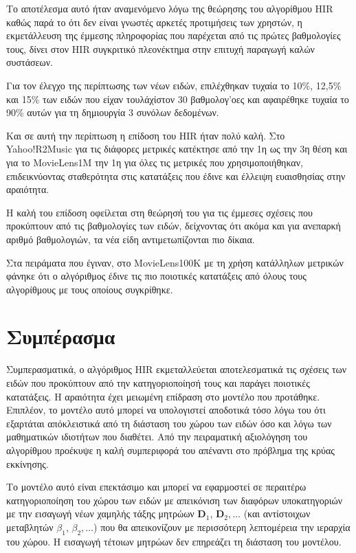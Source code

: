 Το αποτέλεσμα αυτό ήταν αναμενόμενο λόγω της θεώρησης του αλγορίθμου {\en HIR} καθώς παρά το ότι δεν είναι γνωστές αρκετές προτιμήσεις των χρηστών, η εκμετάλλευση της έμμεσης πληροφορίας που παρέχεται από τις πρώτες βαθμολογίες τους, δίνει στον {\en HIR} συγκριτικό πλεονέκτημα στην επιτυχή παραγωγή καλών συστάσεων. \par
Για τον έλεγχο της περίπτωσης των νέων ειδών, επιλέχθηκαν τυχαία το 10\%, 12,5\% και 15\% των ειδών που είχαν τουλάχίστον 30 βαθμολογ'οες και αφαιρέθηκε τυχαία το 90\% αυτών για τη δημιουργία 3 συνόλων δεδομένων. \par
Και σε αυτή την περίπτωση η επίδοση του {\en HIR} ήταν πολύ καλή. Στο {\en Yahoo!R2Music} για τις διάφορες μετρικές κατέκτησε από την 1η ως την 3η θέση και για το {\en MovieLens1M} την 1η για όλες τις μετρικές που χρησιμοποιήθηκαν, επιδεικνύοντας σταθερότητα στις κατατάξεις που έδινε και έλλειψη ευαισθησίας στην αραιότητα. \par
Η καλή του επίδοση οφείλεται στη θεώρησή του για τις έμμεσες σχέσεις που προκύπτουν από τις βαθμολογίες των ειδών, δείχνοντας ότι ακόμα και για ανεπαρκή αριθμό βαθμολογιών, τα νέα είδη αντιμετωπίζονται πιο δίκαια. \par
Στα πειράματα που έγιναν, στο {\en MovieLens100K} με τη χρήση κατάλληλων μετρικών φάνηκε ότι ο αλγόριθμος έδινε τις πιο ποιοτικές κατατάξεις από όλους τους αλγορίθμους με τους οποίους συγκρίθηκε. 
\section{Συμπέρασμα}
Συμπερασματικά, ο αλγόριθμος {\en HIR} εκμεταλλεύεται αποτελεσματικά τις σχέσεις των ειδών που προκύπτουν από την κατηγοριοποίησή τους και παράγει ποιοτικές κατατάξεις. Η αραιότητα έχει μειωμένη επίδραση στο μοντέλο που προτάθηκε. Επιπλέον, το μοντέλο αυτό μπορεί να υπολογιστεί αποδοτικά τόσο λόγω του ότι εξαρτάται απόκλειστικά από τη διάσταση του χώρου των ειδών όσο και λόγω των μαθηματικών ιδιοτήτων που διαθέτει. Από την πειραματική αξιολόγηση του αλγορίθμου προέκυψε η καλή συμπεριφορά του απέναντι στο πρόβλημα της κρύας εκκίνησης. \par
Το μοντέλο αυτό είναι επεκτάσιμο και μπορεί να εφαρμοστεί σε περαιτέρω κατηγοριοποίηση του χώρου των ειδών με απεικόνιση των διαφόρων υποκατηγοριών με την εισαγωγή νέων χαμηλής τάξης μητρώων $\mathbf{D}_1$, $\mathbf{D}_2, \dots$ (και αντίστοιχων μεταβλητών $\beta_1$, $\beta_2, \dots$) που θα απεικονίζουν με περισσότερη λεπτομέρεια την ιεραρχία του χώρου. Η εισαγωγή τέτοιων μητρώων δεν επηρεάζει τη διάσταση του μοντέλου. 